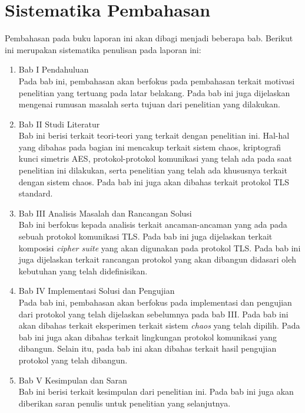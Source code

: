 \section{Sistematika Pembahasan}
Pembahasan pada buku laporan ini akan dibagi menjadi beberapa bab. Berikut ini merupakan sistematika penulisan pada laporan ini:

\begin{enumerate}
  \item Bab I Pendahuluan\\
  Pada bab ini, pembahasan akan berfokus pada pembahasan terkait motivasi penelitian yang tertuang pada latar belakang. Pada bab ini juga dijelaskan mengenai rumusan masalah serta tujuan dari penelitian yang dilakukan.

  \item Bab II Studi Literatur\\
  Bab ini berisi terkait teori-teori yang terkait dengan penelitian ini. Hal-hal yang dibahas pada bagian ini mencakup terkait sistem chaos, kriptografi kunci simetris AES, protokol-protokol komunikasi yang telah ada pada saat penelitian ini dilakukan, serta penelitian yang telah ada khususnya terkait dengan sistem chaos. Pada bab ini juga akan dibahas terkait protokol TLS standard.

  \item Bab III Analisis Masalah dan Rancangan Solusi\\
  Bab ini berfokus kepada analisis terkait ancaman-ancaman yang ada pada sebuah protokol komunikasi TLS. Pada bab ini juga dijelaskan terkait komposisi \emph{cipher suite} yang akan digunakan pada protokol TLS. Pada bab ini juga dijelaskan terkait rancangan protokol yang akan dibangun didasari oleh kebutuhan yang telah didefinisikan.

  \item Bab IV Implementasi Solusi dan Pengujian\\
  Pada bab ini, pembahasan akan berfokus pada implementasi dan pengujian dari protokol yang telah dijelaskan sebelumnya pada bab III. Pada bab ini akan dibahas terkait eksperimen terkait sistem \emph{chaos} yang telah dipilih. Pada bab ini juga akan dibahas terkait lingkungan protokol komunikasi yang dibangun. Selain itu, pada bab ini akan dibahas terkait hasil pengujian protokol yang telah dibangun.

  \item Bab V Kesimpulan dan Saran\\
  Bab ini berisi terkait kesimpulan dari penelitian ini. Pada bab ini juga akan diberikan saran penulis untuk penelitian yang selanjutnya.
\end{enumerate}
